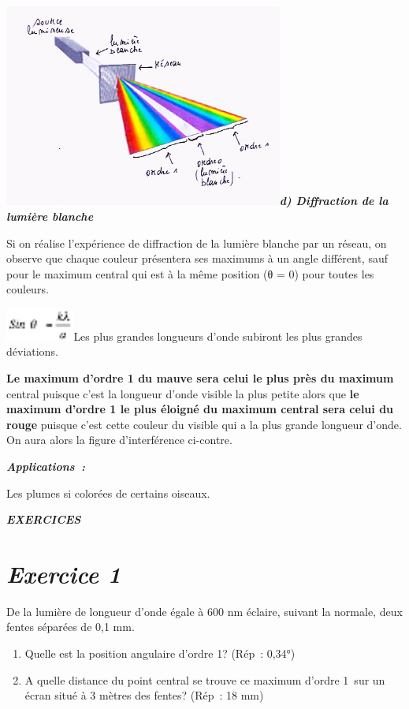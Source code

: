 \includegraphics[width=9.176cm,height=6.676cm]{Pictures/10000001000001FB0000017167AEF9D1A02E0A78.png}\emph{\textbf{d)
Diffraction de la lumière blanche}}

Si on réalise l'expérience de diffraction de la lumière blanche par un
réseau, on observe que chaque couleur présentera ses maximums à un angle
différent, sauf pour le maximum central qui est à la même position (θ =
0) pour toutes les couleurs.

\includegraphics[width=2.259cm,height=1.082cm]{Pictures/100000010000002C0000001558E0CCA95D4F59EB.png}Les
plus grandes longueurs d'onde subiront les plus grandes déviations.

\textbf{Le maximum d'ordre 1 du mauve sera celui le plus près du
maximum} central puisque c'est la longueur d'onde visible la plus petite
alors que \textbf{le maximum d'ordre 1 le plus éloigné du maximum
central sera celui du rouge} puisque c'est cette couleur du visible qui
a la plus grande longueur d'onde. On aura alors la figure d'interférence
ci-contre.

\emph{\textbf{Applications~: }}

Les plumes si colorées de certains oiseaux.

\emph{\textbf{EXERCICES}}

\hypertarget{exercice-1}{%
\section{\texorpdfstring{\emph{Exercice
1}}{Exercice 1}}\label{exercice-1}}

De la lumière de longueur d'onde égale à 600 nm éclaire, suivant la
normale, deux fentes séparées de 0,1 mm.

\begin{enumerate}
\def\labelenumi{\alph{enumi})}
\tightlist
\item
  Quelle est la position angulaire d'ordre 1? (Rép~: 0,34°)
\item
  A quelle distance du point central se trouve ce maximum d'ordre 1~sur
  un écran situé à 3 mètres des fentes? (Rép~: 18 mm)
\end{enumerate}

